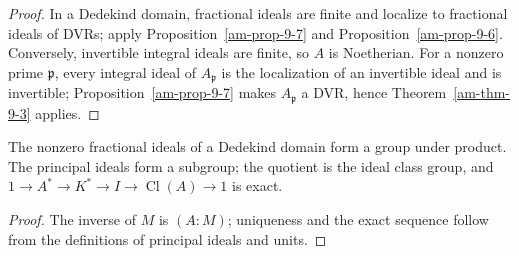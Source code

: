 \begin{proof}
In a Dedekind domain, fractional ideals are finite and localize to fractional
ideals of DVRs; apply Proposition~\ref{am-prop-9-7} and Proposition~\ref{am-prop-9-6}.
Conversely, invertible integral ideals are finite, so $A$ is Noetherian.  For a
nonzero prime $\mathfrak{p}$, every integral ideal of $A_\mathfrak{p}$ is the localization of an
invertible ideal and is invertible; Proposition~\ref{am-prop-9-7} makes
$A_\mathfrak{p}$ a DVR, hence Theorem~\ref{am-thm-9-3} applies.
\end{proof}
\begin{corollary}
\label{am-cor-9-9}
\uses{}
The nonzero fractional ideals of a Dedekind domain form a group under product.
The principal ideals form a subgroup; the quotient is the ideal class group, and
$1\to A^*\to K^*\to I\to\operatorname{Cl}(A)\to1$ is exact.
\end{corollary}
\begin{proof}
The inverse of $M$ is $(A:M)$; uniqueness and the exact sequence follow from
the definitions of principal ideals and units.
\end{proof}
